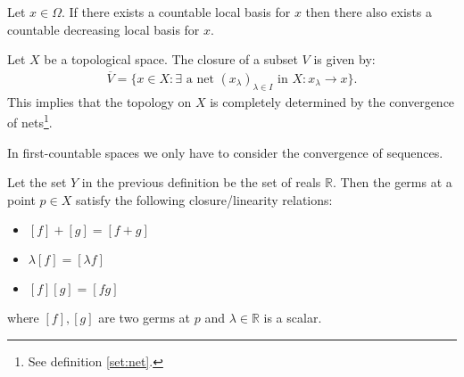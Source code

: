     \begin{property}
        Let $x\in\Omega$. If there exists a countable local basis for $x$ then there also exists a countable decreasing local basis for $x$.
    \end{property}


    \begin{property}
        Let $X$ be a topological space. The closure of a subset $V$ is given by:
        \begin{gather}
            \label{topology:closure}
            \overline{V} = \{x\in X:\exists \text{ a net } (x_\lambda)_{\lambda\in I} \text{ in } X:x_\lambda\rightarrow x\}.
        \end{gather}
        This implies that the topology on $X$ is completely determined by the convergence of nets\footnote{See definition \ref{set:net}.}.
    \end{property}
    \begin{result}
        In first-countable spaces we only have to consider the convergence of sequences.
    \end{result}


    \begin{property}
        Let the set $Y$ in the previous definition be the set of reals $\mathbb{R}$. Then the germs at a point $p\in X$ satisfy the following closure/linearity relations:
        \begin{itemize}
            \item $[f] + [g] = [f+g]$
            \item $\lambda[f] = [\lambda f]$
            \item $[f][g] = [fg]$
        \end{itemize}
        where $[f], [g]$ are two germs at $p$ and $\lambda\in\mathbb{R}$ is a scalar.
    \end{property}

